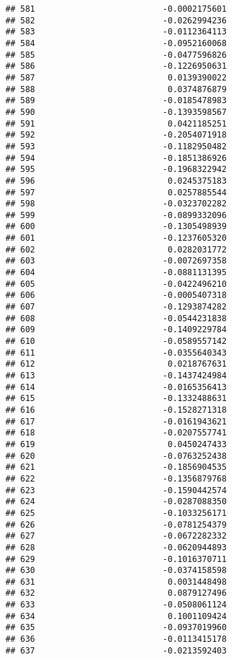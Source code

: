 \documentclass[
]{article}
\begin{document}
\begin{verbatim}
## 581                          -0.0002175601
## 582                          -0.0262994236
## 583                          -0.0112364113
## 584                          -0.0952160068
## 585                          -0.0477596826
## 586                          -0.1226950631
## 587                           0.0139390022
## 588                           0.0374876879
## 589                          -0.0185478983
## 590                          -0.1393598567
## 591                           0.0421185251
## 592                          -0.2054071918
## 593                          -0.1182950482
## 594                          -0.1851386926
## 595                          -0.1968322942
## 596                           0.0245375183
## 597                           0.0257885544
## 598                          -0.0323702282
## 599                          -0.0899332096
## 600                          -0.1305498939
## 601                          -0.1237605320
## 602                           0.0282031772
## 603                          -0.0072697358
## 604                          -0.0881131395
## 605                          -0.0422496210
## 606                          -0.0005407318
## 607                          -0.1293874282
## 608                          -0.0544231838
## 609                          -0.1409229784
## 610                          -0.0589557142
## 611                          -0.0355640343
## 612                           0.0218767631
## 613                          -0.1437424984
## 614                          -0.0165356413
## 615                          -0.1332488631
## 616                          -0.1528271318
## 617                          -0.0161943621
## 618                          -0.0207557741
## 619                           0.0450247433
## 620                          -0.0763252438
## 621                          -0.1856904535
## 622                          -0.1356879768
## 623                          -0.1590442574
## 624                          -0.0287088350
## 625                          -0.1033256171
## 626                          -0.0781254379
## 627                          -0.0672282332
## 628                          -0.0620944893
## 629                          -0.1016370711
## 630                          -0.0374158598
## 631                           0.0031448498
## 632                           0.0879127496
## 633                          -0.0508061124
## 634                           0.1001109424
## 635                          -0.0937019960
## 636                          -0.0113415178
## 637                          -0.0213592403

\end{verbatim}
\end{document}
